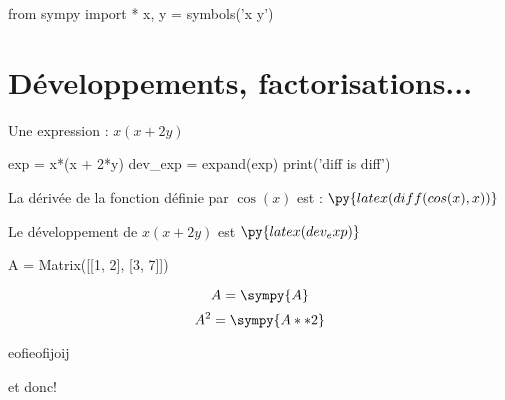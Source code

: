 \documentclass[12pt,a4paper]{article}
\begin{document}
\begin{pycode}
from sympy import *
x, y = symbols('x y')
\end{pycode}



\section{Développements, factorisations...}
Une expression : $x(x + 2y)$
\begin{pycode}
exp = x*(x + 2*y)
dev_exp = expand(exp)
print('diff is diff')
\end{pycode}


La dérivée de la fonction définie par $\cos(x)$ est : $\py{latex(diff(cos(x), x))}$

Le développement de $x(x + 2y)$ est $\py{latex(dev_exp)}$



\begin{sympycode}
A = Matrix([[1, 2], [3, 7]])
\end{sympycode}
%
\begin{equation}
A 
=
\sympy{A}
\end{equation}
%
%
\begin{equation*}
A^2 
=
\sympy{A**2}
\end{equation*}

eofieofijoij


et donc!
\end{document}
